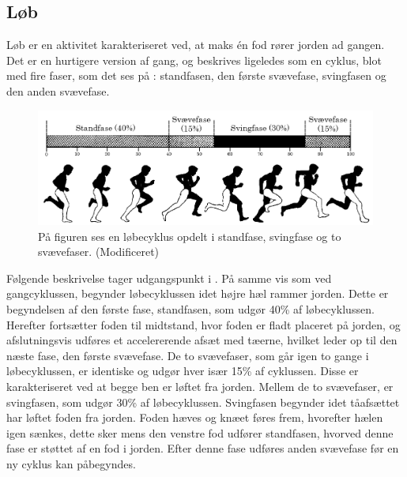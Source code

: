 \subsection{Løb}
Løb er en aktivitet karakteriseret ved, at maks én fod rører jorden ad gangen. 
Det er en hurtigere version af gang, og beskrives ligeledes som en cyklus, blot med fire faser, som det ses på : standfasen, den første svævefase, svingfasen og den anden svævefase. \citep{Adelaar1986,Novacheck1998}

\begin{figure}[H]
	\centering
	\includegraphics[scale=0.4]{figures/bProblemloesning/loeb_cyklus1.png}
	\caption{På figuren ses en løbecyklus opdelt i standfase, svingfase og to svævefaser. \citep{Adelaar1986} (Modificeret)}
	\label{fig:loebecyklus}
\end{figure}

Følgende beskrivelse tager udgangspunkt i . På samme vis som ved gangcyklussen, begynder løbecyklussen idet højre hæl rammer jorden. Dette er begyndelsen af den første fase, standfasen, som udgør 40\% af løbecyklussen. Herefter fortsætter foden til midtstand, hvor foden er fladt placeret på jorden, og afslutningsvis udføres et accelererende afsæt med tæerne, hvilket leder op til den næste fase, den første svævefase. \citep{Adelaar1986,Novacheck1998} \newline
De to svævefaser, som går igen to gange i løbecyklussen, er identiske og udgør hver især 15\% af cyklussen. Disse er karakteriseret ved at begge ben er løftet fra jorden. \citep{Adelaar1986,Novacheck1998} \newline
Mellem de to svævefaser, er svingfasen, som udgør 30\% af løbecyklussen. Svingfasen begynder idet tåafsættet har løftet foden fra jorden. Foden hæves og knæet føres frem, hvorefter hælen igen sænkes, dette sker mens den venstre fod udfører standfasen, hvorved denne fase er støttet af en fod i jorden. Efter denne fase udføres anden svævefase før en ny cyklus kan påbegyndes. \citep{Adelaar1986,Novacheck1998}

